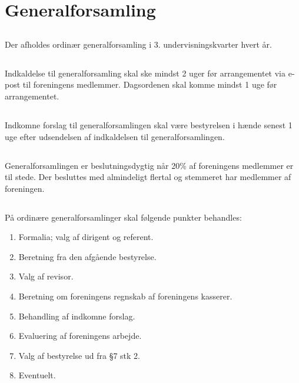 \documentclass[danish,a4paper,twocolumn,oneside,article]{memoir}
\begin{document}
\chapter{Generalforsamling}

\section{} Der afholdes ordinær generalforsamling i 3. undervisningskvarter hvert år.

\section{} Indkaldelse til generalforsamling skal ske mindst 2 uger før arrangementet via e-post til foreningens
medlemmer. Dagsordenen skal komme mindst 1 uge før arrangementet.

\section{} Indkomne forslag til generalforsamlingen skal være bestyrelsen i hænde senest 1 uge efter
udsendelsen af indkaldelsen til generalforsamlingen.

\section{} Generalforsamlingen er beslutningsdygtig når 20\% af foreningens medlemmer er til stede. Der
besluttes med almindeligt flertal og stemmeret har medlemmer af foreningen.

\section{} På ordinære generalforsamlinger skal følgende punkter behandles:

\begin{enumerate}
\item Formalia; valg af dirigent og referent.
\item Beretning fra den afgående bestyrelse.
\item Valg af revisor.
\item Beretning om foreningens regnskab af foreningens kasserer.
\item Behandling af indkomne forslag.
\item Evaluering af foreningens arbejde.
\item Valg af bestyrelse ud fra \S 7 stk 2.
\item Eventuelt.
\end{enumerate}
\end{document}
